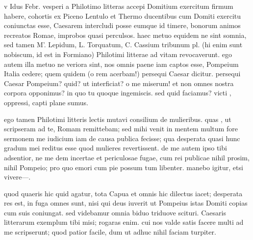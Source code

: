 


 v Idus Febr. vesperi a Philotimo litteras accepi Domitium exercitum firmum habere, cohortis ex Piceno Lentulo et Thermo ducentibus cum Domiti exercitu coniunctas esse, Caesarem intercludi posse eumque id timere, bonorum animos recreatos Romae, improbos quasi perculsos. haec metuo equidem ne sint somnia, sed tamen M'. Lepidum, L. Torquatum, C. Cassium tribunum pl. (hi enim sunt nobiscum, id est in Formiano) Philotimi litterae ad vitam revocaverunt. ego autem illa metuo ne veriora sint, nos omnis paene iam captos esse, Pompeium Italia cedere; quem quidem (o rem acerbam!) persequi Caesar dicitur. persequi Caesar Pompeium? quid? ut interficiat? o me miserum! et non omnes nostra corpora opponimus? in quo tu quoque ingemiscis. sed quid faciamus? victi , oppressi, capti plane sumus.

 ego tamen Philotimi litteris lectis mutavi consilium de mulieribus. quas , ut scripseram ad te, Romam remittebam; sed mihi venit in mentem multum fore sermonem me iudicium iam de causa publica fecisse; qua desperata quasi hunc gradum mei reditus esse quod mulieres revertissent. de me autem ipso tibi adsentior, ne me dem incertae et periculosae fugae, cum rei publicae nihil prosim, nihil Pompeio; pro quo emori cum pie possum tum libenter. manebo igitur, etsi vivere—.

 quod quaeris hic quid agatur, tota Capua et omnis hic dilectus iacet; desperata res est, in fuga omnes sunt, nisi qui deus iuverit ut Pompeius istas Domiti copias cum suis coniungat. sed videbamur omnia biduo triduove scituri. Caesaris litterarum exemplum tibi misi; rogaras enim. cui nos valde satis facere multi ad me scripserunt; quod patior facile, dum ut adhuc nihil faciam turpiter.
